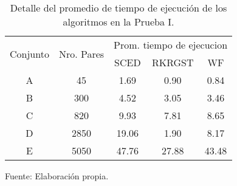 \begin{table}[H]
\centering
\begin{tabular}{|c|c|ccc|}
\hline
\multirow{2}{*}{Conjunto} & \multirow{2}{*}{Nro. Pares} & \multicolumn{3}{c|}{Prom. tiempo de ejecucion}   \\ \cline{3-5}
                          &                             & \multicolumn{1}{c|}{SCED}  & \multicolumn{1}{c|}{RKRGST}   & WF \\ \hline
A                         & 45                          & \multicolumn{1}{c|}{1.69}  & \multicolumn{1}{c|}{0.90}  & 0.84    \\ \hline
B                         & 300                         & \multicolumn{1}{c|}{4.52}  & \multicolumn{1}{c|}{3.05}  & 3.46    \\ \hline
C                         & 820                         & \multicolumn{1}{c|}{9.93}  & \multicolumn{1}{c|}{7.81}  & 8.65    \\ \hline
D                         & 2850                        & \multicolumn{1}{c|}{19.06} & \multicolumn{1}{c|}{1.90}  & 8.17    \\ \hline
E                         & 5050                        & \multicolumn{1}{c|}{47.76} & \multicolumn{1}{c|}{27.88} & 43.48   \\ \hline
\end{tabular}
\caption{Detalle del promedio de tiempo de ejecución de los algoritmos en la Prueba I.}
Fuente: Elaboración propia.
\label{pruebaTiempoI}
\end{table}
